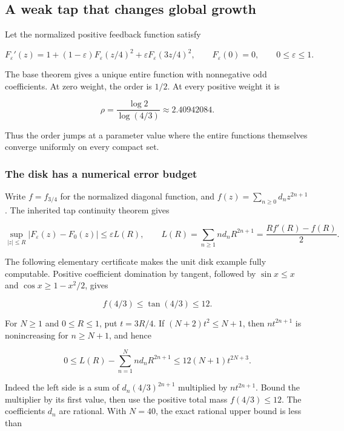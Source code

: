 \hypertarget{v11-resolution_full-a-weak-tap-that-changes-global-growth}{%
\subsection{A weak tap that changes global
growth}\label{v11-resolution_full-a-weak-tap-that-changes-global-growth}}

Let the normalized positive feedback function satisfy

\[
F_\varepsilon'(z)=1+(1-\varepsilon)F_\varepsilon(z/4)^2
 +\varepsilon F_\varepsilon(3z/4)^2,
\qquad F_\varepsilon(0)=0,
\qquad 0\le\varepsilon\le1.
\]

The base theorem gives a unique entire function with nonnegative odd
coefficients. At zero weight, the order is \(1/2\). At every positive
weight it is

\[
\rho=\frac{\log2}{\log(4/3)}\approx2.40942084.
\]

Thus the order jumps at a parameter value where the entire functions
themselves converge uniformly on every compact set.

\hypertarget{v11-resolution_full-the-disk-has-a-numerical-error-budget}{%
\subsubsection{The disk has a numerical error
budget}\label{v11-resolution_full-the-disk-has-a-numerical-error-budget}}

Write \(f=f_{3/4}\) for the normalized diagonal function, and
\(f(z)=\sum_{n\ge0}d_nz^{2n+1}\). The inherited tap continuity theorem
gives

\[
\sup_{|z|\le R}|F_\varepsilon(z)-F_0(z)|
\le \varepsilon L(R),\qquad
L(R)=\sum_{n\ge1}n d_nR^{2n+1}
=\frac{Rf'(R)-f(R)}2.
\tag{RA-1}
\]

The following elementary certificate makes the unit disk example fully
computable. Positive coefficient domination by tangent, followed by
\(\sin x\le x\) and \(\cos x\ge1-x^2/2\), gives

\[
f(4/3)\le\tan(4/3)\le12.
\]

For \(N\ge1\) and \(0\le R\le1\), put \(t=3R/4\). If
\((N+2)t^2\le N+1\), then \(n t^{2n+1}\) is nonincreasing for
\(n\ge N+1\), and hence

\[
0\le L(R)-\sum_{n=1}^{N}n d_nR^{2n+1}
\le12(N+1)t^{2N+3}.
\tag{RA-2}
\]

Indeed the left side is a sum of \(d_n(4/3)^{2n+1}\) multiplied by
\(n t^{2n+1}\). Bound the multiplier by its first value, then use the
positive total mass \(f(4/3)\le12\). The coefficients \(d_n\) are
rational. With \(N=40\), the exact rational upper bound is less than

